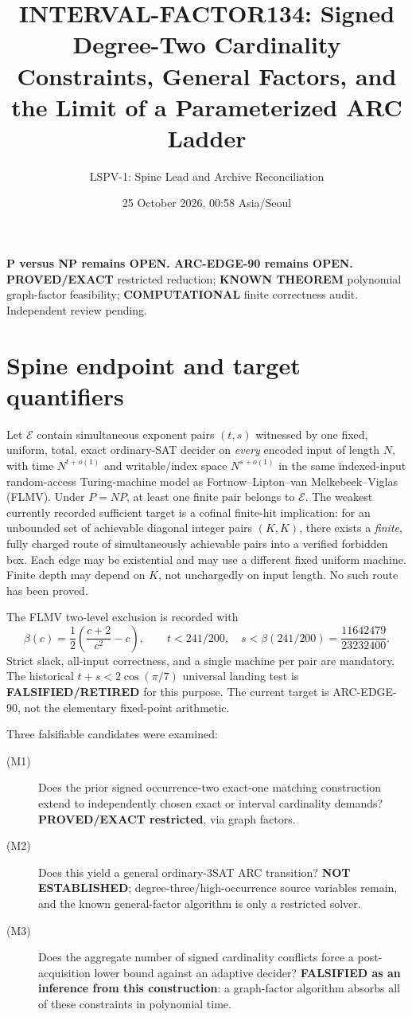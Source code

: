 \documentclass[11pt]{article}
\title{INTERVAL-FACTOR134: Signed Degree-Two Cardinality Constraints,
General Factors, and the Limit of a Parameterized ARC Ladder}
\author{LSPV-1: Spine Lead and Archive Reconciliation}
\date{25 October 2026, 00:58 Asia/Seoul}
\begin{document}
\maketitle
\begin{center}
\textbf{P versus NP remains OPEN. ARC-EDGE-90 remains OPEN.}\\
\textbf{PROVED/EXACT} restricted reduction; \textbf{KNOWN THEOREM}
polynomial graph-factor feasibility; \textbf{COMPUTATIONAL}
finite correctness audit. Independent review pending.
\end{center}

\section{Spine endpoint and target quantifiers}
Let \(\mathcal E\) contain simultaneous exponent pairs \((t,s)\) witnessed by
one fixed, uniform, total, exact ordinary-SAT decider on \emph{every} encoded
input of length \(N\), with time \(N^{t+o(1)}\) and writable/index space
\(N^{s+o(1)}\) in the same indexed-input random-access Turing-machine
model as Fortnow--Lipton--van Melkebeek--Viglas (FLMV).
Under \(P=NP\), at least one finite pair belongs to \(\mathcal E\).
The weakest currently recorded sufficient target is a cofinal
finite-hit implication: for an unbounded set of achievable diagonal
integer pairs \((K,K)\), there exists a \emph{finite}, fully charged route
of simultaneously achievable pairs into a verified forbidden box.
Each edge may be existential and may use a different fixed uniform
machine. Finite depth may depend on \(K\), not unchargedly on input length.
No such route has been proved.

The FLMV two-level exclusion is recorded with
\[
 \beta(c)=\frac{1}{2}\left(\frac{c+2}{c^2}-c\right),\qquad
 t<241/200,\quad s<\beta(241/200)
 =\frac{11642479}{23232400}.
\]
Strict slack, all-input correctness, and a single machine per pair are
mandatory. The historical \(t+s<2\cos(\pi/7)\) universal landing test
is \textbf{FALSIFIED/RETIRED} for this purpose.
The current target is ARC-EDGE-90, not the elementary fixed-point arithmetic.

Three falsifiable candidates were examined:
\begin{description}
\item[(M1)] Does the prior signed occurrence-two exact-one matching
construction extend to independently chosen exact or interval
cardinality demands? \textbf{PROVED/EXACT restricted}, via graph factors.
\item[(M2)] Does this yield a general ordinary-3SAT ARC transition?
\textbf{NOT ESTABLISHED}; degree-three/high-occurrence source variables
remain, and the known general-factor algorithm is only a restricted solver.
\item[(M3)] Does the aggregate number of signed cardinality conflicts
force a post-acquisition lower bound against an adaptive decider?
\textbf{FALSIFIED as an inference from this construction}: a graph-factor
algorithm absorbs all of these constraints in polynomial time.
\end{description}
\end{document}
